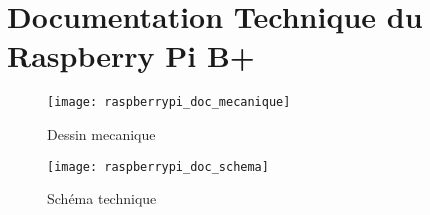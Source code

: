 
\chapter{Documentation Technique du Raspberry Pi B+}
\label{annexe:rpi}

\begin{figure}[!h]
  \centering
  \texttt{[image: raspberrypi\_doc\_mecanique]}
  \caption{Dessin mecanique}
\end{figure}

\begin{figure}[!h]
  \centering
  \texttt{[image: raspberrypi\_doc\_schema]}
  \caption{Schéma technique}
\end{figure}

